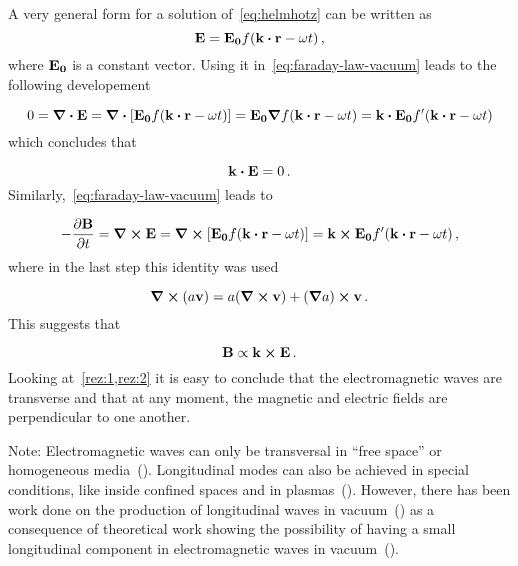 \documentclass[12pt, class=report, crop=false]{standalone}
\begin{document}
\par
A very general form for a solution of~\cref{eq:helmhotz} can be written as
\begin{equation*}
  \vb{E} = \vb{E_0} f(\vb{k}\vdot\vb{r} -\omega t) \,,
\end{equation*}
where \(\vb{E_0}\) is a constant vector.
Using it in~\cref{eq:faraday-law-vacuum} leads to the following developement

\begin{equation*}
  0 = \div{\vb{E}} = \div{\left[\vb{E_0} f(\vb{k}\vdot\vb{r} -\omega t) \right]} = \vb{E_0} \grad{f(\vb{k}\vdot\vb{r} -\omega t)} = \vb{k}\vdot\vb{E_0} f'(\vb{k}\vdot\vb{r} -\omega t)
\end{equation*}
which concludes that

\begin{equation}
  \label{rez:1}
  \vb{k}\vdot\vb{E} = 0 \,.
\end{equation}
Similarly,~\cref{eq:faraday-law-vacuum} leads to

\begin{equation*}
  - \pdv{\vb{B}}{t}  = \curl{\vb{E}} = \curl{\left[\vb{E_0} f(\vb{k}\vdot\vb{r} -\omega t) \right]} = \vb{k}\cp \vb{E_0} f'(\vb{k}\vdot\vb{r} -\omega t) \, ,
\end{equation*}
where in the last step this identity was used

\begin{equation}
  \label{id:curl-scalar*vector}
  \curl{(a\vb{v})} = a (\curl{\vb{v}}) + (\grad{a})\cp\vb{v}\,.
\end{equation}
This suggests that

\begin{equation}
  \label{rez:2}
  \vb{B} \propto \vb{k}\cp\vb{E} \,.
\end{equation}
Looking at~\cref{rez:1,rez:2} it is easy to conclude that the electromagnetic waves are transverse and that at any moment, the magnetic and electric fields are perpendicular to one another.

\par
Note: Electromagnetic waves can only be transversal in ``free space'' or homogeneous media~(\cite{heavisideElectromagneticTheoryIncluding1971}). Longitudinal modes can also be achieved in special conditions, like inside confined spaces and in plasmas~(\cite{jacksonClassicalElectrodynamics1999,griffithsIntroductionElectrodynamics1999}). However, there has been work done on the production of longitudinal waves in vacuum~(\cite{wangCreationNeedleLongitudinally2008}) as a consequence of theoretical work showing the possibility of having a small longitudinal component in electromagnetic waves in vacuum~(\cite{cicchitelliLongitudinalFieldComponents1990}).
\end{document}
